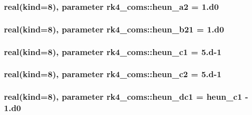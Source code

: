 \subsubsection[{heun\+\_\+a2}]{\setlength{\rightskip}{0pt plus 5cm}real(kind=8), parameter rk4\+\_\+coms\+::heun\+\_\+a2 = 1.d0}\label{namespacerk4__coms_a87d69315c8ce5a8eece7631c044e56e5}
\hypertarget{namespacerk4__coms_ae8d76c010784094c3299f39f54d015c1}{}
\subsubsection[{heun\+\_\+b21}]{\setlength{\rightskip}{0pt plus 5cm}real(kind=8), parameter rk4\+\_\+coms\+::heun\+\_\+b21 = 1.d0}\label{namespacerk4__coms_ae8d76c010784094c3299f39f54d015c1}
\hypertarget{namespacerk4__coms_aacfe35ff98522754e71ad11a44b521b4}{}
\subsubsection[{heun\+\_\+c1}]{\setlength{\rightskip}{0pt plus 5cm}real(kind=8), parameter rk4\+\_\+coms\+::heun\+\_\+c1 = 5.d-\/1}\label{namespacerk4__coms_aacfe35ff98522754e71ad11a44b521b4}
\hypertarget{namespacerk4__coms_afad602ec1632d28447fa784393dd4777}{}
\subsubsection[{heun\+\_\+c2}]{\setlength{\rightskip}{0pt plus 5cm}real(kind=8), parameter rk4\+\_\+coms\+::heun\+\_\+c2 = 5.d-\/1}\label{namespacerk4__coms_afad602ec1632d28447fa784393dd4777}
\hypertarget{namespacerk4__coms_aeea9fe3a451738a304eacef0dfa174a1}{}
\subsubsection[{heun\+\_\+dc1}]{\setlength{\rightskip}{0pt plus 5cm}real(kind=8), parameter rk4\+\_\+coms\+::heun\+\_\+dc1 = {\bf heun\+\_\+c1} -\/ 1.d0}\label{namespacerk4__coms_aeea9fe3a451738a304eacef0dfa174a1}
\hypertarget{namespacerk4__coms_ad638286586253a3741b0fd05bd2456a3}{}
